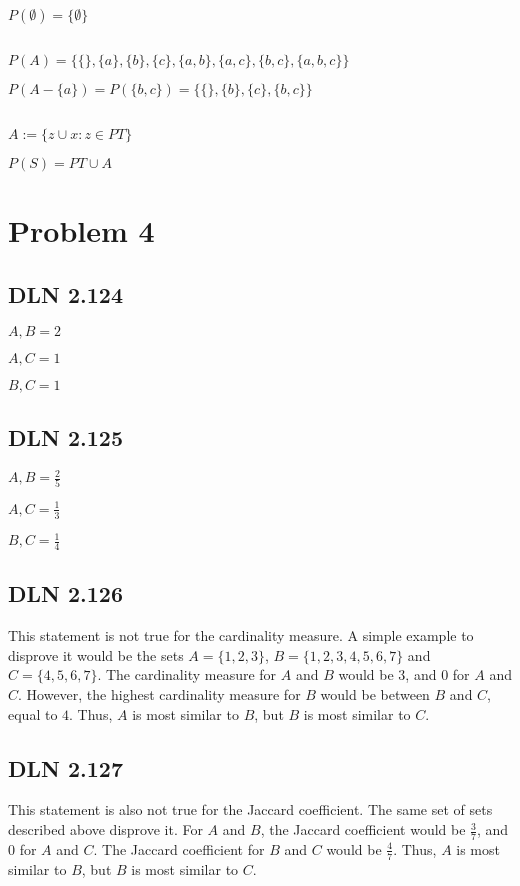 \documentclass[titlepage]{article}
\begin{document}
\(P(\emptyset) = \{\emptyset\}\)

\subsection{}
\(P(A) = \{\{\},\{a\},\{b\},\{c\},\{a,b\},\{a,c\},\{b,c\},\{a,b,c\}\}\)

\(P(A -\{a\}) = P(\{b,c\}) = \{\{\},\{b\},\{c\},\{b,c\}\}\)

\subsection{}
\(A:= \{z \cup x : z \in PT\}\)

\(P(S)= PT \cup A\)

\section{Problem 4}

\subsection{DLN 2.124}

\(A,B = 2\)

\(A,C = 1\)

\(B,C = 1\)

\subsection{DLN 2.125}

\(A,B = \frac{2}{5}\)

\(A,C = \frac{1}{3}\)

\(B,C = \frac{1}{4}\)

\subsection{DLN 2.126}

This statement is not true for the cardinality measure. A simple example to disprove it would be the sets \(A = \{1,2,3\}\), \(B = \{1,2,3,4,5,6,7\}\) and \(C = \{4,5,6,7\}\). The cardinality measure for $A$ and $B$ would be $3$, and $0$ for $A$ and $C$. However, the highest cardinality measure for $B$ would be between $B$ and $C$, equal to $4$. Thus, $A$ is most similar to $B$, but $B$ is most similar to $C$.

\subsection{DLN 2.127}

This statement is also not true for the Jaccard coefficient. The same set of sets described above disprove it. For $A$ and $B$, the Jaccard coefficient would be \(\frac{3}{7}\), and \(0\) for $A$ and $C$. The Jaccard coefficient for $B$ and $C$ would be \(\frac{4}{7}\). Thus, $A$ is most similar to $B$, but $B$ is most similar to $C$.
\end{document}
